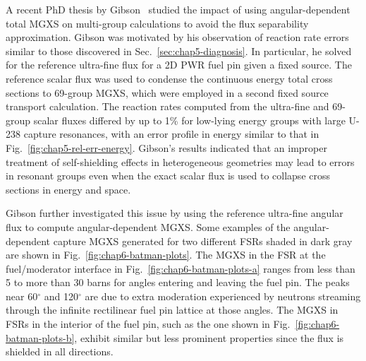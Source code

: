 A recent PhD thesis by Gibson~\cite{gibson2016thesis} studied the impact of using angular-dependent total \ac{MGXS} on multi-group calculations to avoid the flux separability approximation. Gibson was motivated by his observation of reaction rate errors similar to those discovered in Sec.~\ref{sec:chap5-diagnosis}. In particular, he solved for the reference ultra-fine flux for a 2D \ac{PWR} fuel pin given a fixed source. The reference scalar flux was used to condense the continuous energy total cross sections to 69-group \ac{MGXS}, which were employed in a second fixed source transport calculation. The reaction rates computed from the ultra-fine and 69-group scalar fluxes differed by up to 1\% for low-lying energy groups with large U-238 capture resonances, with an error profile in energy similar to that in Fig.~\ref{fig:chap5-rel-err-energy}. Gibson's results indicated that an improper treatment of self-shielding effects in heterogeneous geometries may lead to errors in resonant groups even when the exact scalar flux is used to collapse cross sections in energy and space.

Gibson further investigated this issue by using the reference ultra-fine angular flux to compute angular-dependent \ac{MGXS}. Some examples of the angular-dependent capture \ac{MGXS} generated for two different \ac{FSR}s shaded in dark gray are shown in Fig.~\ref{fig:chap6-batman-plots}. The \ac{MGXS} in the \ac{FSR} at the fuel/moderator interface in Fig.~\ref{fig:chap6-batman-plots-a} ranges from less than 5 to more than 30 barns for angles entering and leaving the fuel pin. The peaks near 60$^{\circ}$ and 120$^{\circ}$ are due to extra moderation experienced by neutrons streaming through the infinite rectilinear fuel pin lattice at those angles. The \ac{MGXS} in \ac{FSR}s in the interior of the fuel pin, such as the one shown in Fig.~\ref{fig:chap6-batman-plots-b}, exhibit similar but less prominent properties since the flux is shielded in all directions.

